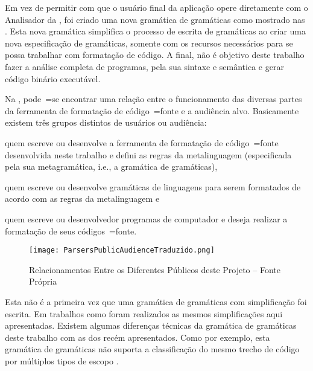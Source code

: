 Em vez de permitir com que o usuário final da aplicação opere diretamente com o Analisador da ,
foi criado uma nova gramática de gramáticas como mostrado nas .
Esta nova gramática simplifica o processo de escrita de gramáticas ao criar uma nova especificação de gramáticas,
somente com os recursos necessários para se possa trabalhar com formatação de código.
A final,
não é objetivo deste trabalho fazer a análise completa de programas,
pela sua sintaxe e
semântica e
gerar código binário executável.

Na ,
pode~=se encontrar uma relação entre o funcionamento das diversas partes da ferramenta de formatação de código~=fonte e
a audiência alvo.
Basicamente existem três grupos distintos de usuários ou
audiência:
\begin{inparaenum}[1)]
\item quem escreve ou
desenvolve a ferramenta de formatação de código~=fonte desenvolvida neste trabalho e
defini as regras da metalinguagem (especificada pela sua metagramática,
i.e.,
a gramática de gramáticas),
\item quem escreve ou
desenvolve gramáticas de linguagens para serem formatados de acordo com as regras da metalinguagem e
\item quem escreve ou
desenvolvedor programas de computador e
deseja realizar a formatação de seus códigos~=fonte.
\end{inparaenum}%
\begin{figure}[h]
\centering
\texttt{[image: ParsersPublicAudienceTraduzido.png]}
\caption[Relacionamentos entre os Diferentes Públicos deste Projeto]{Relacionamentos Entre os Diferentes Públicos deste Projeto -- Fonte Própria \cite{larkErrorRecovery}}
\label{ParsersPublicAudienceTraduzido}
\end{figure}

Esta não é a primeira vez que uma gramática de gramáticas com simplificação foi escrita.
Em trabalhos como  foram realizados as mesmos simplificações aqui apresentadas.
Existem algumas diferenças técnicas da gramática de gramáticas deste trabalho com as dos recém apresentados.
Como por exemplo,
esta gramática de gramáticas não suporta a classificação do mesmo trecho de código por múltiplos tipos de escopo \cite{vsCodeSyntaxHighlighthing}.

